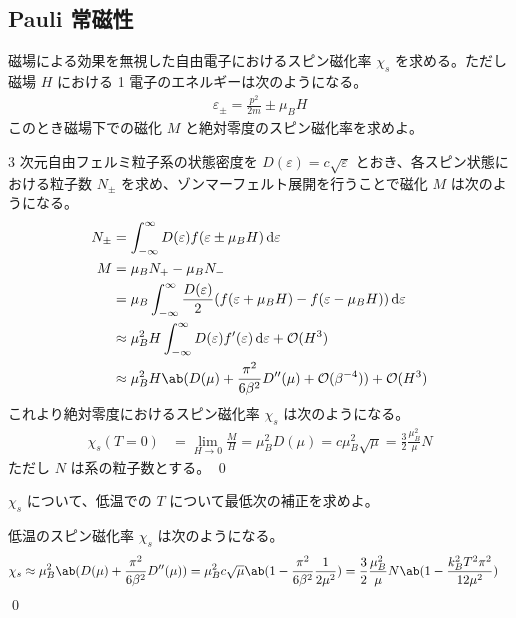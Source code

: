 \documentclass[uplatex,dvipdfmx,a4paper,11pt]{jlreq}
\makeatletter
\numberwithin{equation}{section}
\theoremstyle{definition}
\renewenvironment{proof}[1][\proofname]{\par
  \normalfont
  \topsep6\p@\@plus6\p@ \trivlist
  \item[\hskip\labelsep{\bfseries #1}\@addpunct{\bfseries}]\ignorespaces\quad\par
}{%
  \qed\endtrivlist\@endpefalse
}
\renewcommand\proofname{証明}
\makeatother
\begin{document}
\subsection{Pauli 常磁性}
\begin{problem}
磁場による効果を無視した自由電子におけるスピン磁化率 $\chi_s$ を求める。ただし磁場 $H$ における 1 電子のエネルギーは次のようになる。
\begin{align}
  \varepsilon_{\pm} = \frac{p^2}{2m} \pm \mu_BH
\end{align}
このとき磁場下での磁化 $M$ と絶対零度のスピン磁化率を求めよ。
\end{problem}
\begin{proof}
  3 次元自由フェルミ粒子系の状態密度を $D(\varepsilon) = c\sqrt{\varepsilon}$ とおき、各スピン状態における粒子数 $N_\pm$ を求め、ゾンマーフェルト展開を行うことで磁化 $M$ は次のようになる。
  \begin{align}
    N_\pm & = \int_{-\infty}^{\infty}D(\varepsilon)f(\varepsilon \pm \mu_BH)\dl{\varepsilon}                                          \\
    M     & = \mu_BN_+ - \mu_BN_-                                                                                                     \\
          & = \mu_B\int_{-\infty}^{\infty}\frac{D(\varepsilon)}{2}(f(\varepsilon + \mu_BH) - f(\varepsilon - \mu_BH))\dl{\varepsilon} \\
          & \approx \mu_B^2H\int_{-\infty}^{\infty}D(\varepsilon)f'(\varepsilon)\dl{\varepsilon} + \mathcal{O}(H^3)                   \\
          & \approx \mu_B^2H\ab(D(\mu) + \frac{\pi^2}{6\beta^2}D''(\mu) + \mathcal{O}(\beta^{-4})) + \mathcal{O}(H^3)
  \end{align}
  これより絶対零度におけるスピン磁化率 $\chi_s$ は次のようになる。
  \begin{align}
    \chi_s(T=0) & = \lim_{H\to 0}\frac{M}{H} = \mu_B^2D(\mu) = c\mu_B^2\sqrt{\mu} = \frac{3}{2}\frac{\mu_B^2}{\mu}N
  \end{align}
  ただし $N$ は系の粒子数とする。
\end{proof}

\begin{problem}
$\chi_s$ について、低温での $T$ について最低次の補正を求めよ。
\end{problem}
\begin{proof}
  低温のスピン磁化率 $\chi_s$ は次のようになる。
  \begin{align}
    \chi_s & \approx \mu_B^2\ab(D(\mu) + \frac{\pi^2}{6\beta^2}D''(\mu)) = \mu_B^2c\sqrt{\mu}\ab(1 - \frac{\pi^2}{6\beta^2}\frac{1}{2\mu^2}) = \frac{3}{2}\frac{\mu_B^2}{\mu}N\ab(1 - \frac{k_B^2T^2\pi^2}{12\mu^2})
  \end{align}
\end{proof}
\end{document}
